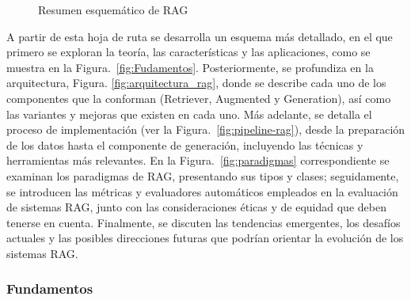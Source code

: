 \begin{figure}[H]
\begin{center}
\end{center}
\caption{Resumen esquemático de RAG}
\label{fig:secciones-rag}
\end{figure}

A partir de esta hoja de ruta se desarrolla un esquema más detallado, en el que primero se exploran la teoría, 
las características y las aplicaciones, como se muestra en la Figura.~\ref{fig:Fudamentos}. Posteriormente, se profundiza en la arquitectura, Figura. \ref{fig:arquitectura_rag}, 
donde se describe cada uno de los componentes que la conforman (Retriever, Augmented y Generation), así como las variantes y mejoras que existen en cada uno. 
Más adelante, se detalla el proceso de implementación (ver la  Figura.~\ref{fig:pipeline-rag}), desde la preparación de los datos hasta el componente de generación, incluyendo las técnicas y herramientas más relevantes.  
En la Figura.~\ref{fig:paradigmas} correspondiente se examinan los paradigmas de RAG, presentando sus tipos y clases; seguidamente, se introducen las métricas y evaluadores automáticos 
empleados en la evaluación de sistemas RAG, junto con las consideraciones éticas y de equidad que deben tenerse en cuenta.  
Finalmente, se discuten las tendencias emergentes, los desafíos actuales y las posibles direcciones futuras que podrían orientar la evolución de los sistemas RAG.  





\subsubsection{Fundamentos}

